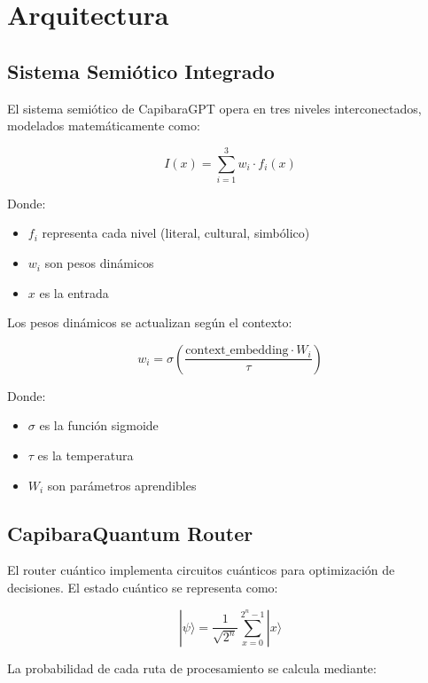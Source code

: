 \documentclass[12pt,a4paper]{article}
\begin{document}
\section{Arquitectura}

\subsection{Sistema Semiótico Integrado}

El sistema semiótico de CapibaraGPT opera en tres niveles interconectados, modelados matemáticamente como:

\begin{equation}
    I(x) = \sum_{i=1}^{3} w_i \cdot f_i(x)
\end{equation}

Donde:
\begin{itemize}
    \item $f_i$ representa cada nivel (literal, cultural, simbólico)
    \item $w_i$ son pesos dinámicos
    \item $x$ es la entrada
\end{itemize}

Los pesos dinámicos se actualizan según el contexto:

\begin{equation}
    w_i = \sigma\left(\frac{\text{context\_embedding} \cdot W_i}{\tau}\right)
\end{equation}

Donde:
\begin{itemize}
    \item $\sigma$ es la función sigmoide
    \item $\tau$ es la temperatura
    \item $W_i$ son parámetros aprendibles
\end{itemize}

\subsection{CapibaraQuantum Router}

El router cuántico implementa circuitos cuánticos para optimización de decisiones. El estado cuántico se representa como:

\begin{equation}
    |\psi\rangle = \frac{1}{\sqrt{2^n}}\sum_{x=0}^{2^n-1} |x\rangle
\end{equation}

La probabilidad de cada ruta de procesamiento se calcula mediante:
\end{document}
